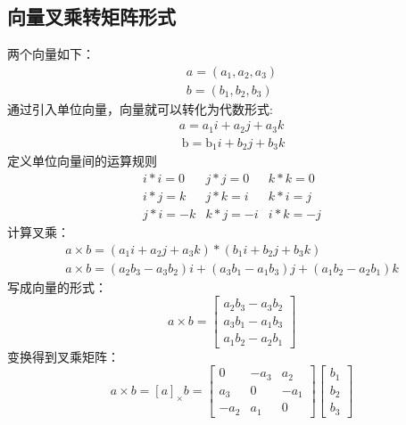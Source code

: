 \documentclass[12pt]{article}
\begin{document}
\subsection{向量叉乘转矩阵形式}
两个向量如下：
\begin{equation}
    \nonumber
    \begin{array}{l}
        a=\left(a_{1}, a_{2}, a_{3}\right) \\
        b=\left(b_{1}, b_{2}, b_{3}\right)
        \end{array}
\end{equation}
通过引入单位向量，向量就可以转化为代数形式:
\begin{equation}
    \nonumber
    \begin{array}{l}
        a=a_{1} i+a_{2} j+a_{3} k \\
        \mathrm{~b}=\mathrm{b}_{1} i+b_{2} j+b_{3} k
        \end{array}
\end{equation}
定义单位向量间的运算规则
\begin{equation}
    \nonumber
    \begin{array}{ccc}
        i * i=0 & j * j=0 & k * k=0 \\
        i * j=k & j * k=i & k * i=j \\
        j * i=-k & k * j=-i & i * k=-j
        \end{array}
\end{equation}
计算叉乘：
\begin{equation}
    \nonumber
    \begin{array}{l}
        a \times b=\left(a_{1} i+a_{2} j+a_{3} k\right) *\left(b_{1} i+b_{2} j+b_{3} k\right) \\
        a \times b=\left(a_{2} b_{3}-a_{3} b_{2}\right) i+\left(a_{3} b_{1}-a_{1} b_{3}\right) j+\left(a_{1} b_{2}-a_{2} b_{1}\right) k
        \end{array}
\end{equation}
写成向量的形式：
\begin{equation}
    \nonumber
    a \times b=\left[\begin{array}{l}
        a_{2} b_{3}-a_{3} b_{2} \\
        a_{3} b_{1}-a_{1} b_{3} \\
        a_{1} b_{2}-a_{2} b_{1}
        \end{array}\right]
\end{equation}
变换得到叉乘矩阵：
\begin{equation}
    \nonumber
    a \times b=[a]_{\times} b=\left[\begin{array}{ccc}
        0 & -a_{3} & a_{2} \\
        a_{3} & 0 & -a_{1} \\
        -a_{2} & a_{1} & 0
        \end{array}\right]\left[\begin{array}{l}
        b_{1} \\
        b_{2} \\
        b_{3}
        \end{array}\right]
\end{equation}
\end{document}

